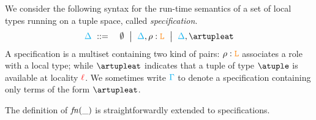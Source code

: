 We consider the following syntax for the run-time semantics of a set of local types running on a 
tuple space, called {\em specification}.
%
\begin{eqnarray*}
  \envmv & \bnfdef & \emptyset \bnfmid
                  \envmv, \arole :  \aL \bnfmid
                  \envmv, \artupleat                  
\end{eqnarray*}
%
A specification is a multiset containing two kind of pairs:  $\rho :  \texttt{\textcolor{orange}L}$   associates a 
role with a local type; while $\artupleat$  indicates that a 
tuple of type $\atuple$ is available at locality ${\color{red}\ell}$. 
%
We sometimes write $\textcolor{cyan}{\Gamma}$ to denote a specification containing only
terms of the form $\artupleat$. 

The definition of ${\it fn}(\_)$ is straightforwardly  extended to specifications. 

